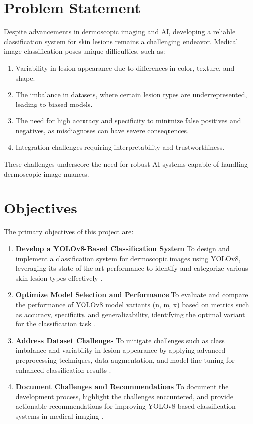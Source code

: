 \documentclass[a4paper,12pt]{report}
\begin{document}
\begin{spacing}{1.5}
    \section{Problem Statement}
    Despite advancements in dermoscopic imaging and AI, developing a reliable classification system for skin lesions remains a challenging endeavor. Medical image classification poses unique difficulties, such as:
    \begin{enumerate}
        \item Variability in lesion appearance due to differences in color, texture, and shape.
        \item The imbalance in datasets, where certain lesion types are underrepresented, leading to biased models.
        \item The need for high accuracy and specificity to minimize false positives and negatives, as misdiagnoses can have severe consequences.
        \item Integration challenges requiring interpretability and trustworthiness.
    \end{enumerate}
    These challenges underscore the need for robust AI systems capable of handling dermoscopic image nuances\cite{intro5}\cite{intro6}.

    \section{Objectives}
    The primary objectives of this project are:
    \begin{enumerate}
        \item \textbf{Develop a YOLOv8-Based Classification System} To design and implement a classification system for dermoscopic images using YOLOv8, leveraging its state-of-the-art performance to identify and categorize various skin lesion types effectively \cite{intro7}\cite{intro8}.
        \item \textbf{Optimize Model Selection and Performance} To evaluate and compare the performance of YOLOv8 model variants (n, m, x) based on metrics such as accuracy, specificity, and generalizability, identifying the optimal variant for the classification task \cite{intro9}.
        \item \textbf{Address Dataset Challenges} To mitigate challenges such as class imbalance and variability in lesion appearance by applying advanced preprocessing techniques, data augmentation, and model fine-tuning for enhanced classification results \cite{intro8}\cite{intro10}.
        \item \textbf{Document Challenges and Recommendations} To document the development process, highlight the challenges encountered, and provide actionable recommendations for improving YOLOv8-based classification systems in medical imaging \cite{intro7}\cite{intro9}.
    \end{enumerate}


\end{spacing}
\end{document}

